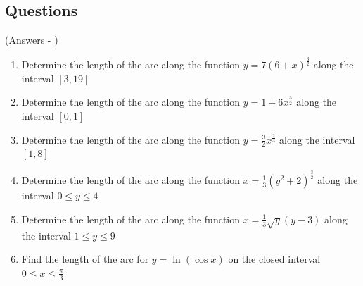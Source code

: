 \documentclass[../main.tex]{subfiles}
\begin{document}
\subsection*{Questions}
(Answers - {\pageref{Arc length answers}})
\label{Arc length}
\begin{enumerate}[itemsep=0.7cm]
    \item 
    Determine the length of the arc along the function $y=7(6+x)^{\frac{3}{2}}$ along the interval $[3,19]$

    \item
    Determine the length of the arc along the function $y=1+6x^{\frac{3}{2}}$ along the interval $[0,1]$

    \item 
    Determine the length of the arc along the function $y=\frac{3}{2}x^{\frac{2}{3}}$ along the interval $[1,8]$

    \item 
    Determine the length of the arc along the function $x=\frac{1}{3}(y^2+2)^{\frac{3}{2}}$ along the interval $0\leq y \leq 4$

    \item 
    Determine the length of the arc along the function $x=\frac{1}{3}\sqrt{y}(y-3)$ along the interval $1\leq y \leq 9$

    \item 
    Find the length of the arc for $y=\ln{(\cos{x})}$ on the closed interval $0 \leq x \leq \frac{\pi}{3}$

\end{enumerate}
\end{document}
